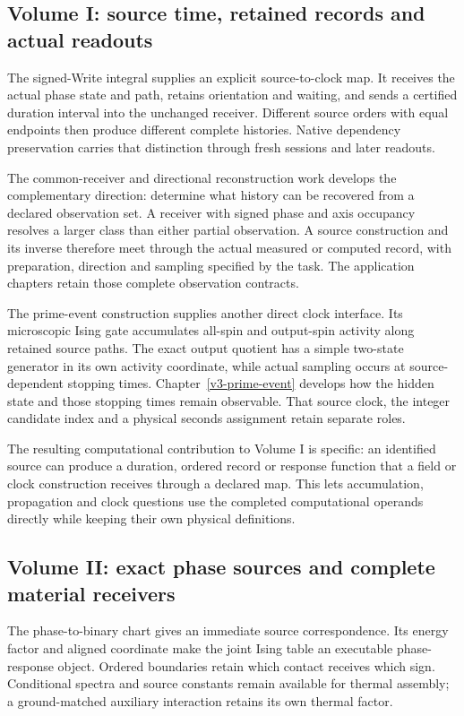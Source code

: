 \subsection{Volume I: source time, retained records and actual readouts}

The signed-Write integral supplies an explicit source-to-clock map. It receives the actual phase state and path, retains orientation and waiting, and sends a certified duration interval into the unchanged receiver. Different source orders with equal endpoints then produce different complete histories. Native dependency preservation carries that distinction through fresh sessions and later readouts.

The common-receiver and directional reconstruction work develops the complementary direction: determine what history can be recovered from a declared observation set. A receiver with signed phase and axis occupancy resolves a larger class than either partial observation. A source construction and its inverse therefore meet through the actual measured or computed record, with preparation, direction and sampling specified by the task. The application chapters retain those complete observation contracts.

The prime-event construction supplies another direct clock interface. Its microscopic Ising gate accumulates all-spin and output-spin activity along retained source paths. The exact output quotient has a simple two-state generator in its own activity coordinate, while actual sampling occurs at source-dependent stopping times. Chapter~\ref{v3-prime-event} develops how the hidden state and those stopping times remain observable. That source clock, the integer candidate index and a physical seconds assignment retain separate roles.

The resulting computational contribution to Volume I is specific: an identified source can produce a duration, ordered record or response function that a field or clock construction receives through a declared map. This lets accumulation, propagation and clock questions use the completed computational operands directly while keeping their own physical definitions.

\subsection{Volume II: exact phase sources and complete material receivers}

The phase-to-binary chart gives an immediate source correspondence. Its energy factor and aligned coordinate make the joint Ising table an executable phase-response object. Ordered boundaries retain which contact receives which sign. Conditional spectra and source constants remain available for thermal assembly; a ground-matched auxiliary interaction retains its own thermal factor.

